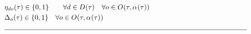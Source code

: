 \begin{alignat}{2}
	& \VarTacticalWorkBinaryConsecutive \in \{0, 1\}\quad                                                                                                                                                                                                               \quad \forall \ElementDays \in \SetDays{} \quad \forall \ElementOperation \in \SetOperation{}{\VarStrategicWorkOrderAssignment{}{}}                                                                                                                                                        \\
	& \VarTacticalOperationDifference \in \{0, 1\}                                                                                                                                                                                                                              \quad \forall \ElementOperation \in \SetOperation{}{\VarStrategicWorkOrderAssignment{}{}}\\
	& \text{\rule{\linewidth}{0.4pt}} \notag
\end{alignat}

